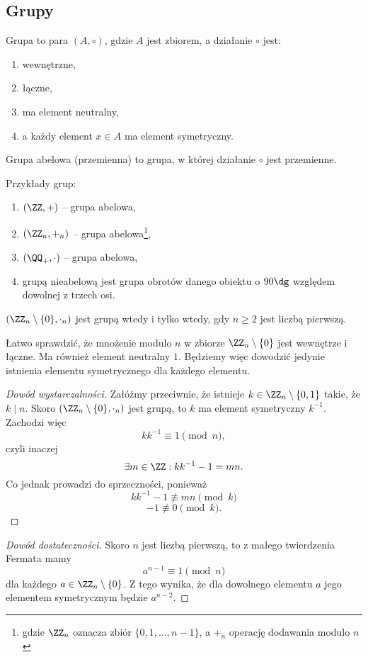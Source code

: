 \subsection{Grupy}
\begin{definition}
    Grupa to para $(A, \circ)$, gdzie $A$ jest zbiorem, a działanie $\circ$ jest:
    \begin{enumerate}
        \item wewnętrzne,
        \item łączne,
        \item ma element neutralny,
        \item a każdy element $x \in A$ ma element symetryczny.
    \end{enumerate}
\end{definition}

\begin{definition}
    Grupa abelowa (przemienna) to grupa, w której działanie $\circ$ jest przemienne.
\end{definition}

\begin{example}
    Przykłady grup:
    \begin{enumerate}
        \item $(\ZZ, +)$ -- grupa abelowa,
        \item $(\ZZ_n, +_n)$ -- grupa abelowa\footnote{gdzie $\ZZ_n$ oznacza zbiór $\{0, 1, \ldots, n-1\}$, a $+_n$ operację dodawania modulo $n$},
        \item $(\QQ_+, \cdot)$ -- grupa abelowa,
        \item grupą nieabelową jest grupa obrotów danego obiektu o $90\dg$ względem dowolnej z trzech osi.
    \end{enumerate}
\end{example}

\begin{theorem}
    \label{t:prime_n->group}
    $(\ZZ_n \setminus \{0\}, \cdot_n)$ jest grupą wtedy i tylko wtedy, gdy $n \geq 2$ jest liczbą pierwszą.
\end{theorem}
Łatwo sprawdzić, że mnożenie modulo $n$ w zbiorze $\ZZ_n \setminus \{0\}$ jest wewnętrze i łączne. Ma również element neutralny $1$. Będziemy więc dowodzić jedynie istnienia elementu symetrycznego dla każdego elementu.
\begin{proof}[Dowód wystarczalności]\renewcommand{\qedsymbol}{}
    Załóżmy przeciwnie, że istnieje $k \in \ZZ_n \setminus \{0, 1\}$ takie, że $k \mid n$. Skoro $(\ZZ_n \setminus \{0\}, \cdot_n)$ jest grupą, to $k$ ma element symetryczny $k^{-1}$. Zachodzi więc
    $$ kk^{-1} \equiv 1 \pmod{n}, $$
    czyli inaczej
    $$ \exists m \in \ZZ : kk^{-1} - 1 = mn. $$
    Co jednak prowadzi do sprzeczności, ponieważ
    $$ kk^{-1} - 1 \not\equiv mn \pmod{k} $$
    $$ - 1 \not\equiv 0 \pmod{k}. $$
\end{proof}
\begin{proof}[Dowód dostateczności]
    Skoro $n$ jest liczbą pierwszą, to z małego twierdzenia Fermata mamy
    $$ a^{n-1} \equiv 1 \pmod{n} $$
    dla każdego $a \in \ZZ_n \setminus \{0\}$.
    Z tego wynika, że dla dowolnego elementu $a$ jego elementem symetrycznym będzie $a^{n-2}$.
\end{proof}

